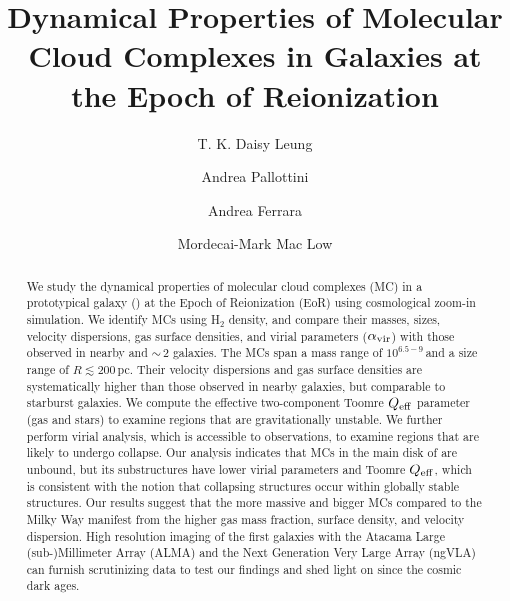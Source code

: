 \IfFileExists{emulateapjlegacy.cls}{\documentclass[iop]{emulateapjlegacy}}{\documentclass[iop]{emulateapj}}
\begin{document}
\title{Dynamical Properties of Molecular Cloud Complexes in Galaxies at the Epoch of Reionization}

\author{T. K. Daisy Leung}
\author{Andrea Pallottini}
\author{Andrea Ferrara}
\author{Mordecai-Mark Mac Low}



\begin{abstract}
We study the dynamical properties of molecular cloud complexes (MC) in a prototypical galaxy (\flower)
at the Epoch of Reionization (EoR) using cosmological zoom-in simulation.
%
We identify MCs using H$_2$ density, and compare their masses, sizes, velocity dispersions, gas surface densities, and virial parameters ($\alpha_{\rm vir}$) with those observed in nearby and \z$\sim$\,2 galaxies.
%
The MCs span a mass range of $10^{6.5-9}$\,\Msun and a size range of $R\lesssim200$\,pc. Their velocity dispersions and gas surface densities are systematically higher than those observed in nearby galaxies, but comparable to starburst galaxies.
%
We compute the effective two-component Toomre $Q_{\rm eff}$ parameter (gas and stars) to examine regions that are
gravitationally unstable.
%
We further perform virial analysis, which is accessible to observations, to examine regions that are likely
to undergo collapse. Our analysis indicates that MCs in the main disk of \flower are unbound, but its
substructures have lower virial parameters and Toomre $Q_{\rm eff}$, which is consistent
with the notion that collapsing structures occur within globally stable structures.
%
Our results suggest that the more massive and bigger MCs compared to the Milky Way manifest from the
higher gas mass fraction, surface density, and velocity dispersion.
High resolution imaging of the first galaxies with the Atacama Large (sub-)Millimeter Array (ALMA) and the Next Generation Very Large Array (ngVLA) can furnish scrutinizing data to test our findings and shed light on \SF since the cosmic dark ages.
\end{abstract}
\end{document}
